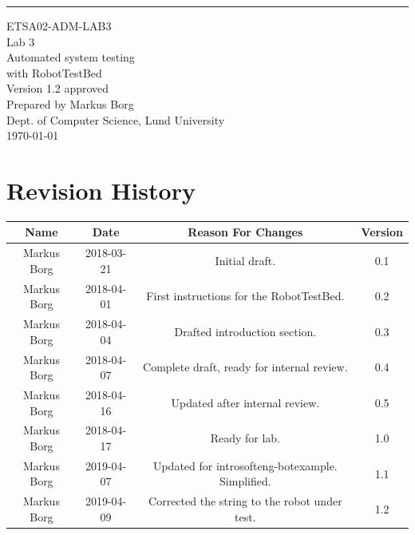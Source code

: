 \documentclass{scrreprt}
\date{}
\def\myversion{1.2 }
\begin{document}
\begin{flushright}
    \rule{16cm}{5pt}\vskip1cm
    \begin{bfseries}
    	\LARGE{ETSA02-ADM-LAB3}\\
    	\vspace{1.5cm}
        \Huge{Lab 3}\\
        \vspace{0.5cm}
        Automated system testing\\
        \vspace{0.5cm}
        with RobotTestBed\\
        \vspace{1.5cm}
        \LARGE{Version \myversion approved}\\
        \vspace{1.5cm}
        Prepared by Markus Borg\\
        Dept. of Computer Science, Lund University\\
        \vspace{1.5cm}
        \today\\
    \end{bfseries}
\end{flushright}


\chapter*{Revision History}

\begin{center}
    \begin{tabular}{|c|c|c|c|}
        \hline
	    Name & Date & Reason For Changes & Version\\
        \hline
	    Markus Borg & 2018-03-21 & Initial draft. & 0.1\\
        \hline
        Markus Borg & 2018-04-01 & First instructions for the RobotTestBed. & 0.2\\
        \hline
        Markus Borg & 2018-04-04 & Drafted introduction section. & 0.3\\
        \hline
        Markus Borg & 2018-04-07 & Complete draft, ready for internal review. & 0.4\\
        \hline
        Markus Borg & 2018-04-16 & Updated after internal review. & 0.5\\
        \hline
        Markus Borg & 2018-04-17 & Ready for lab. & 1.0\\
        \hline
        Markus Borg & 2019-04-07 & Updated for introsofteng-botexample. Simplified. & 1.1\\
        \hline
        Markus Borg & 2019-04-09 & Corrected the string to the robot under test. & 1.2\\
        \hline
    \end{tabular}
\end{center}
\end{document}
